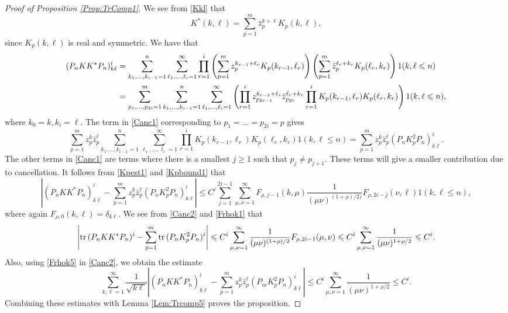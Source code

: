 \documentclass{article}
\numberwithin{equation}{section}
\numberwithin{figure}{section}
\theoremstyle{plain}
\theoremstyle{plain}
\numberwithin{thm}{section}
\theoremstyle{remark}
\newcommand{\Tr}{\text{{\rm tr\,}}}
\let \le \leqslant
\let \ge \geqslant
\begin{document}
\begin{proof}[Proof of Proposition \ref{Prop:TrComp1}]
We see from \eqref{Kkl} that
\begin{equation*}
K^*(k,\ell)=\sum_{p=1}^m\bar{z}_p^{k+\ell}K_p(k,\ell),
\end{equation*}
since $K_p(k,\ell)$ is real and symmetric. We have that 
\begin{align}\label{Canc1}
 (P_nKK^*P_n)^i_{k\ell}&=\sum_{k_1,\dots,k_{i-1}=1}^n  \sum_{\ell_1,\dots,\ell_i=1}^\infty\prod_{r=1}^i\left(\sum_{p=1}^m z_p^{k_{r-1}+\ell_r}K_p(k_{r-1},\ell_r)\right)\left(\sum_{p=1}^m \bar{z}_p^{\ell_r+k_r}K_p(\ell_r,k_r)\right)1(k,\ell\le n)\notag\\
 &=\sum_{p_1,\dots,p_{2i}=1}^m\sum_{k_1,\dots,k_{i-1}=1}^n  \sum_{\ell_1,\dots,\ell_i=1}^\infty\left(\prod_{r=1}^iz_{p_{2r-1}}^{k_{r-1}+\ell_r}\bar{z}_{p_{2r}}^{\ell_r+k_r}\prod_{r=1}^i
 K_p(k_{r-1},\ell_r)K_p(\ell_r,k_r)\right)1(k,\ell\le n),
\end{align}
where $k_0=k,k_i=\ell$. The term in \eqref{Canc1} corresponding to $p_1=\dots=p_{2i}=p$ gives
\begin{equation*}
    \sum_{p=1}^mz_p^k\bar{z}_p^\ell\sum_{k_1,\dots,k_{i-1}=1}^n  \sum_{\ell_1,\dots,\ell_i=1}^\infty\prod_{r=1}^iK_p(k_{r-1},\ell_r)K_p(\ell_r,k_r)1(k,\ell\le n)=\sum_{p=1}^mz_p^k\bar{z}_p^\ell(P_nK_p^2P_n)^i_{k\ell}.
\end{equation*}
The other terms in \eqref{Canc1} are terms where there is a smallest $j\ge 1$ such that $p_j\neq p_{j+1}$. These terms will give a smaller contribution due to cancellation. It follows from \eqref{Kpest1} and \eqref{Kpbound1} that
\begin{equation}\label{Canc2}
    \left|(P_nKK^*P_n)^i_{k\ell}-\sum_{p=1}^m z_p^k\bar{z}_p^\ell(P_nK_p^2P_n)^i_{k\ell}\right|\le
    C^i\sum_{j=1}^{2i-1}\sum_{\mu,\nu=1}^\infty F_{\rho,j-1}(k,\mu)
    \frac 1{(\mu\nu)^{(1+\rho)/2)}}F_{\rho,2i-j}(\nu,\ell)1(k,\ell\le n),
\end{equation}
where again $F_{\rho,0}(k,\ell)=\delta_{k\ell}$. We see from \eqref{Canc2} and \eqref{Frhok1} that
\begin{equation*}
    \left|\Tr(P_nKK^*P_n)^i-\sum_{p=1}^m\Tr(P_nK_p^2P_n)^i\right|
    \le C^i\sum_{\mu,\nu=1}^\infty\frac 1{(\mu\nu)^{(1+\rho)/2}}F_{\rho,2i-1}(\mu,\nu)\le C^i\sum_{\mu,\nu=1}^\infty\frac 1{(\mu\nu)^{1+\rho/2}}\le C^i.
\end{equation*}
Also, using \eqref{Frhok5} in \eqref{Canc2}, we obtain the estimate
\begin{equation*}
    \sum_{k,\ell=1}^\infty\frac 1{\sqrt{k\ell}}\left|(P_nKK^*P_n)^i_{k\ell}-\sum_{p=1}^mz_p^k\bar{z}_p^\ell(P_mK_p^2P_n)^i_{k\ell}\right|
    \le C^i\sum_{\mu,\nu=1}^\infty \frac 1{(\mu\nu)^{1+\rho/2}}\le C^i.
\end{equation*}
Combining these estimates with Lemma \ref{Lem:Trcomp5} proves the proposition.
\end{proof}
\end{document}
